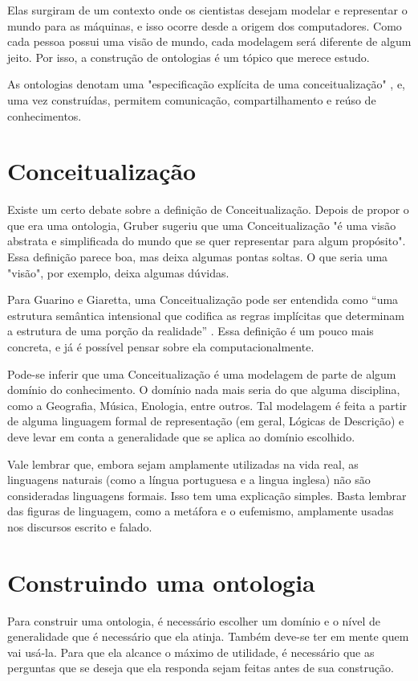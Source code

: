 Elas surgiram de um contexto onde os cientistas desejam modelar e representar o mundo para as máquinas, e isso ocorre desde a origem dos computadores. Como cada pessoa possui uma visão de mundo, cada modelagem será diferente de algum jeito. Por isso, a construção de ontologias é um tópico que merece estudo.

As ontologias denotam uma "especificação explícita de uma conceitualização"  \citep{ontoGruber}, e, uma vez construídas, permitem comunicação, compartilhamento e reúso de conhecimentos.

\section{Conceitualização}
	
Existe um certo debate sobre a definição de Conceitualização. Depois de propor o que era uma ontologia, Gruber sugeriu que uma Conceitualização "é uma visão abstrata e simplificada do mundo que se quer representar para algum propósito". Essa definição parece boa, mas deixa algumas pontas soltas. O que seria uma "visão", por exemplo, deixa algumas dúvidas.

Para Guarino e Giaretta, uma Conceitualização pode ser entendida como “uma estrutura semântica intensional que codifica as regras implícitas que determinam a estrutura de uma porção da realidade” \citep{ontoGiaretta}. Essa definição é um pouco mais concreta, e já é possível pensar sobre ela computacionalmente.

Pode-se inferir que uma Conceitualização é uma modelagem de parte de algum domínio do conhecimento. O domínio nada mais seria do que alguma disciplina, como a Geografia, Música, Enologia, entre outros. Tal modelagem é feita a partir de alguma linguagem formal de representação (em geral, Lógicas de Descrição) e deve levar em conta a generalidade que se aplica ao domínio escolhido.

Vale lembrar que, embora sejam amplamente utilizadas na vida real, as linguagens naturais (como a língua portuguesa e a lingua inglesa) não são consideradas linguagens formais. Isso tem uma explicação simples. Basta lembrar das figuras de linguagem, como a metáfora e o eufemismo, amplamente usadas nos discursos escrito e falado. 

\section{Construindo uma ontologia}

Para construir uma ontologia, é necessário escolher um domínio e o nível de generalidade que é necessário que ela atinja. Também deve-se ter em mente quem vai usá-la. Para que ela alcance o máximo de utilidade, é necessário que as perguntas que se deseja que ela responda sejam feitas antes de sua construção.

